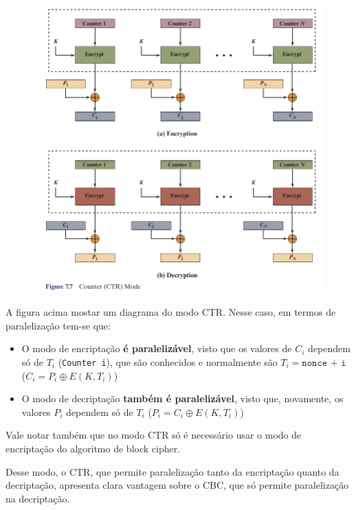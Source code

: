 \documentclass{article}
\begin{document}
\newpage
\FloatBarrier
\begin{figure}[!ht]
    \begin{center}
        \includegraphics[width=\textwidth]{images/ctr_mode.png}
    \end{center}
\end{figure} 

A figura acima mostar um diagrama do modo CTR. Nesse caso, em termos de paralelização tem-se que:

\begin{itemize}
    \item O modo de encriptação \textbf{é paralelizável}, visto que os valores de $C_i$ dependem só de $T_i$ (\texttt{Counter i}), que são conhecidos e normalmente são $T_i = \texttt{nonce + i}$ ($C_i = P_i \oplus E(K, T_i)$)
    \item O modo de decriptação \textbf{também é paralelizável}, visto que, novamente, os valores $P_i$ dependem só de $T_i$ ($P_i = C_i \oplus E(K, T_i)$)
\end{itemize}

Vale notar também que no modo CTR só é necessário usar o modo de encriptação do algoritmo de block cipher.

Desse modo, o CTR, que permite paralelização tanto da encriptação quanto da decriptação, apresenta clara vantagem sobre o CBC, que só permite paralelização na decriptação.
\end{document}
